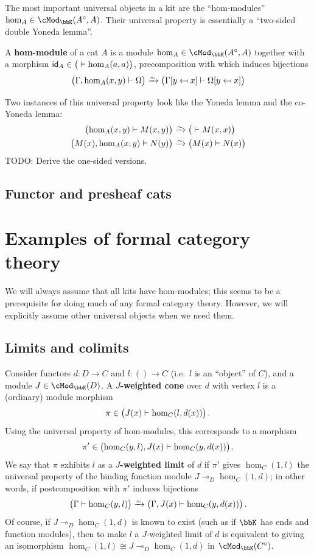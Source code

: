 \documentclass{amsart}
\newcommand{\K}{\bbK}
\let\mod\cMod
\def\modk{\mod_\K}
\def\mor#1{\hom_{#1}}
\renewcommand{\o}{^{\circ}}
\let\mto\vdash    %
\def\mhom#1#2{\left( #1 \vphantom{\big|}\mto #2 \right)}
\newcommand{\subst}[3]{{#1}[#2 \mapsfrom #3]}
\renewcommand{\id}{\mathsf{id}}
\begin{document}
The most important universal objects in a kit are the ``hom-modules'' $\mor A \in \modk(A\o,A)$.
Their universal property is essentially a ``two-sided double Yoneda lemma''.

\begin{defn}
  A \textbf{hom-module} of a cat $A$ is a module $\mor A \in \modk(A\o,A)$ together with a morphism $\id_A \in \mhom{}{\mor A(a,a)}$, precomposition with which induces bijections
  \[ \mhom{\Gamma,\mor A(x,y)}{\Omega} \toiso
  \mhom{\subst\Gamma y x}{\subst\Omega y x}
  \]
\end{defn}

Two instances of this universal property look like the Yoneda lemma and the co-Yoneda lemma:
\begin{align*}
  \mhom{\mor A(x,y)}{M(x,y)} &\toiso \mhom{}{M(x,x)}\\
  \mhom{M(x),\mor A(x,y)}{N(y)} &\toiso \mhom{M(x)}{N(x)}
\end{align*}
TODO: Derive the one-sided versions.


\subsection{Functor and presheaf cats}
\label{sec:func-pshf}


\section{Examples of formal category theory}
\label{sec:examples}

We will always assume that all kits have hom-modules; this seems to be a prerequisite for doing much of any formal category theory.
However, we will explicitly assume other universal objects when we need them.

\subsection{Limits and colimits}

Consider functors $d:D\to C$ and $l:()\to C$ (i.e.\ $l$ is an ``object'' of $C$), and a module $J\in\modk(D)$.
A \textbf{$J$-weighted cone} over $d$ with vertex $l$ is a (ordinary) module morphism
\[ \pi \in \mhom{J(x)}{\mor{C}(l,d(x))}. \]
Using the universal property of hom-modules, this corresponds to a morphism
\[ \pi' \in \mhom{\mor{C}(y,l),J(x)}{\mor{C}(y,d(x))}. \]
We say that $\pi$ exhibits $l$ as a \textbf{$J$-weighted limit} of $d$ if $\pi'$ gives $\mor C(1,l)$ the universal property of the binding function module $J \multimap_D \mor{C}(1,d)$; in other words, if postcomposition with $\pi'$ induces bijections
\[ \mhom{\Gamma}{\mor{C}(y,l)} \toiso \mhom{\Gamma,J(x)}{\mor{C}(y,d(x))}. \]
Of course, if $J \multimap_D \mor{C}(1,d)$ is known to exist (such as if $\K$ has ends and function modules), then to make $l$ a $J$-weighted limit of $d$ is equivalent to giving an isomorphism $\mor{C}(1,l) \cong J \multimap_D \mor{C}(1,d)$ in $\modk(C\o)$.
\end{document}
